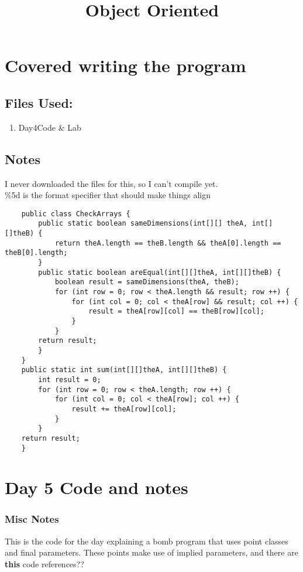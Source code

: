 \documentclass{article}
\begin{document}
\title{Object Oriented}
\maketitle

\section{Covered writing the program }

    \subsection{Files Used:}

    \begin{enumerate}
        \item{Day4Code \& Lab} 
    \end{enumerate}

    \subsection{Notes}
    I never downloaded the files for this, so I can't compile yet. \\
    \%5d is the format specifier that should make things align
    
    \begin{lstlisting}
    public class CheckArrays {
        public static boolean sameDimensions(int[][] theA, int[][]theB) {
            return theA.length == theB.length && theA[0].length == theB[0].length;
        }
        public static boolean areEqual(int[][]theA, int[][]theB) {
            boolean result = sameDimensions(theA, theB);
            for (int row = 0; row < theA.length && result; row ++) {
                for (int col = 0; col < theA[row] && result; col ++) {
                    result = theA[row][col] == theB[row][col];
                }
            }
        return result;
        }
    }
    public static int sum(int[][]theA, int[][]theB) {
        int result = 0;
        for (int row = 0; row < theA.length; row ++) {
            for (int col = 0; col < theA[row]; col ++) {
                result += theA[row][col];
            }
        }
    return result;
    }
    \end{lstlisting}

\section{Day 5 Code and notes}
    \subsubsection{ Misc Notes}
    This is the code for the day explaining a bomb program that uses point classes and final parameters. These points make use of implied parameters, and there are \textbf{this} code references?? \\
    
\end{document}
